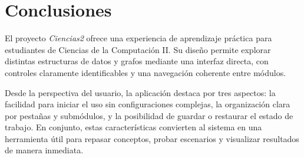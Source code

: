 \documentclass[10pt,onecolumn]{IEEEtran}
\begin{document}
\section{Conclusiones}
El proyecto \textit{Ciencias2} ofrece una experiencia de aprendizaje práctica para estudiantes de Ciencias de la Computación II. Su diseño permite explorar distintas estructuras de datos y grafos mediante una interfaz directa, con controles claramente identificables y una navegación coherente entre módulos.

Desde la perspectiva del usuario, la aplicación destaca por tres aspectos: la facilidad para iniciar el uso sin configuraciones complejas, la organización clara por pestañas y submódulos, y la posibilidad de guardar o restaurar el estado de trabajo. En conjunto, estas características convierten al sistema en una herramienta útil para repasar conceptos, probar escenarios y visualizar resultados de manera inmediata.
\end{document}

